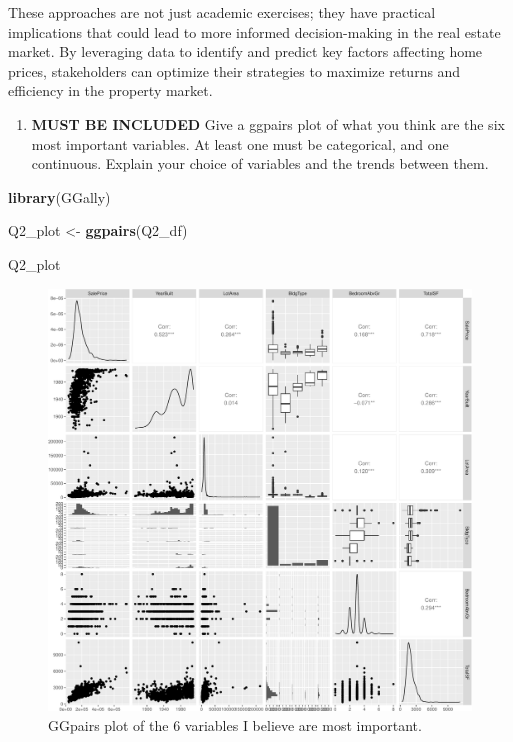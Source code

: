 \documentclass[
]{article}
\newenvironment{Shaded}{\begin{snugshade}}{\end{snugshade}}
\newcommand{\FunctionTok}[1]{\textcolor[rgb]{0.13,0.29,0.53}{\textbf{#1}}}
\newcommand{\NormalTok}[1]{#1}
\newcommand{\OtherTok}[1]{\textcolor[rgb]{0.56,0.35,0.01}{#1}}
\providecommand{\tightlist}{%
  \setlength{\itemsep}{0pt}\setlength{\parskip}{0pt}}
\begin{document}
These approaches are not just academic exercises; they have practical
implications that could lead to more informed decision-making in the
real estate market. By leveraging data to identify and predict key
factors affecting home prices, stakeholders can optimize their
strategies to maximize returns and efficiency in the property market.

\vspace{2cm}

\newpage

\begin{enumerate}
\def\labelenumi{\arabic{enumi})}
\setcounter{enumi}{1}
\tightlist
\item
  \textbf{MUST BE INCLUDED} Give a ggpairs plot of what you think are
  the six most important variables. At least one must be categorical,
  and one continuous. Explain your choice of variables and the trends
  between them.
\end{enumerate}

\begin{Shaded}
\begin{Highlighting}[]
\FunctionTok{library}\NormalTok{(GGally)}

\NormalTok{Q2\_plot }\OtherTok{\textless{}{-}} \FunctionTok{ggpairs}\NormalTok{(Q2\_df)}

\NormalTok{Q2\_plot}
\end{Highlighting}
\end{Shaded}

\begin{figure}
\centering
\includegraphics{STAT847_W24_Final_files/figure-latex/unnamed-chunk-7-1.pdf}
\caption{GGpairs plot of the 6 variables I believe are most important.}
\end{figure}
\end{document}
